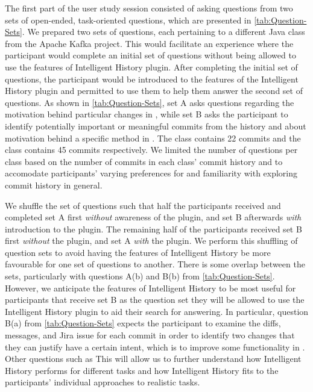 The first part of the user study session consisted of asking questions from two sets of open-ended, task-oriented questions, which are presented in \autoref{tab:Question-Sets}.
We prepared two sets of questions, each pertaining to a different Java class from the Apache Kafka project.
This would facilitate an experience where the participant would complete an initial set of questions without being allowed to use the features of Intelligent History plugin.
After completing the initial set of questions, the participant would be introduced to the features of the Intelligent History plugin and permitted to use them to help them answer the second set of questions.
As shown in \autoref{tab:Question-Sets}, set A asks questions regarding the motivation behind particular changes in , while set B asks the participant to identify potentially important or meaningful commits from the history and about motivation behind a specific method in .
The  class contains 22 commits and the  class contains 45 commits respectively.
We limited the number of questions per class based on the number of commits in each class' commit history and to accomodate participants' varying preferences for and familiarity with exploring commit history in general.

We shuffle the set of questions such that half the participants received and completed set A first \emph{without} awareness of the plugin, and set B afterwards \emph{with} introduction to the plugin.
The remaining half of the participants received set B first \emph{without} the plugin, and set A \emph{with} the plugin.
We perform this shuffling of question sets to avoid having the features of Intelligent History be more favourable for one set of questions to another.
There is some overlap between the sets, particularly with questions A(b) and B(b) from \autoref{tab:Question-Sets}.
However, we anticipate the features of Intelligent History to be most useful for participants that receive set B as the question set they will be allowed to use the Intelligent History plugin to aid their search for answering.
In particular, question B(a) from \autoref{tab:Question-Sets} expects the participant to examine the diffs, messages, and Jira issue for each commit in order to identify two changes that they can justify have a certain intent, which is to improve some functionality in . 
Other questions such as 
This will allow us to further understand how Intelligent History performs for different tasks and how Intelligent History fits to the participants' individual approaches to realistic tasks.

